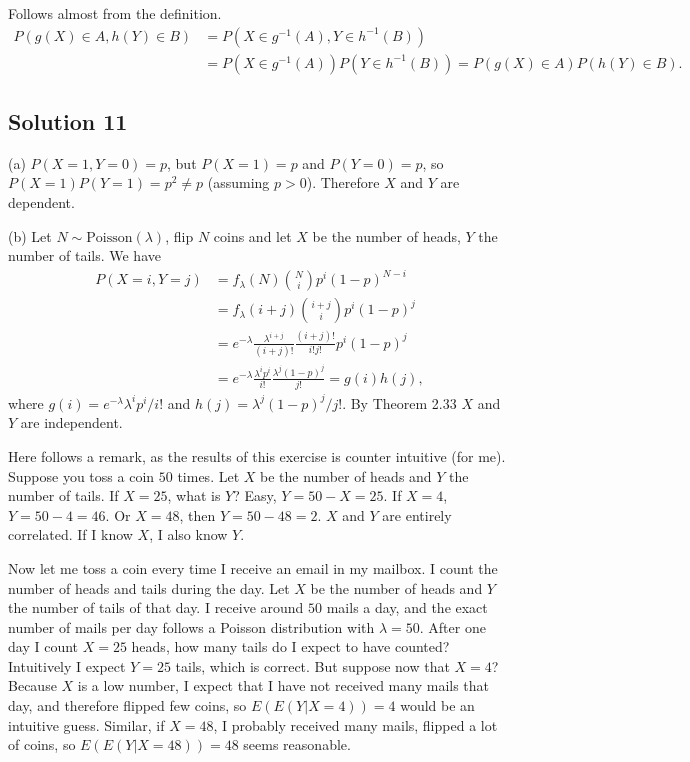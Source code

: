 Follows almost from the definition.
\begin{equation*}
\begin{split}
P(g(X) \in A, h(Y) \in B)
    &= P(X \in g^{-1}(A), Y \in h^{-1}(B)) \\
    &= P(X \in g^{-1}(A)) P(Y \in h^{-1}(B))
    = P(g(X) \in A) P(h(Y) \in B).
\end{split}
\end{equation*}


\subsection*{Solution 11}

(a) $P(X = 1, Y = 0) = p$, but $P(X = 1) = p$ and $P(Y = 0) = p$, so $P(X = 1)P(Y = 1) = p^2 \neq p$ (assuming $p > 0$).
Therefore $X$ and $Y$ are dependent.

(b) Let $N \sim \mathrm{Poisson}(\lambda)$, flip $N$ coins and let $X$ be the number of heads, $Y$ the number of tails.
We have
\begin{equation*}
\begin{split}
P(X = i, Y = j)
    &= f_{\lambda}(N) \binom{N}{i} p^i (1 - p)^{N - i} \\
    &= f_{\lambda}(i + j) \binom{i + j}{i} p^i (1 - p)^j \\
    &= e^{-\lambda} \frac{\lambda^{i + j}}{(i + j)!} \frac{(i + j)!}{i! j!} p^i (1 - p)^j \\
    &= e^{-\lambda} \frac{\lambda^i p^i}{i!} \frac{\lambda^j (1 - p)^j}{j!} = g(i) h(j),
\end{split}
\end{equation*}
where $g(i) = e^{-\lambda} \lambda^i p^i / i!$ and $h(j) = \lambda^j (1 - p)^j / j!$.
By Theorem 2.33 $X$ and $Y$ are independent.

Here follows a remark, as the results of this exercise is counter intuitive (for me).
Suppose you toss a coin $50$ times.
Let $X$ be the number of heads and $Y$ the number of tails.
If $X = 25$, what is $Y$? Easy, $Y = 50 - X = 25$.
If $X = 4$, $Y = 50 - 4 = 46$.
Or $X = 48$, then $Y = 50 - 48 = 2$.
$X$ and $Y$ are entirely correlated.
If I know $X$, I also know $Y$.

Now let me toss a coin every time I receive an email in my mailbox.
I count the number of heads and tails during the day.
Let $X$ be the number of heads and $Y$ the number of tails of that day.
I receive around $50$ mails a day, and the exact number of mails per day follows a Poisson distribution with $\lambda = 50$.
After one day I count $X = 25$ heads, how many tails do I expect to have counted?
Intuitively I expect $Y = 25$ tails, which is correct.
But suppose now that $X = 4$?
Because $X$ is a low number, I expect that I have not received many mails that day, and therefore flipped few coins, so $E(E(Y | X = 4)) = 4$ would be an intuitive guess.
Similar, if $X = 48$, I probably received many mails, flipped a lot of coins, so $E(E(Y | X = 48)) = 48$ seems reasonable.

